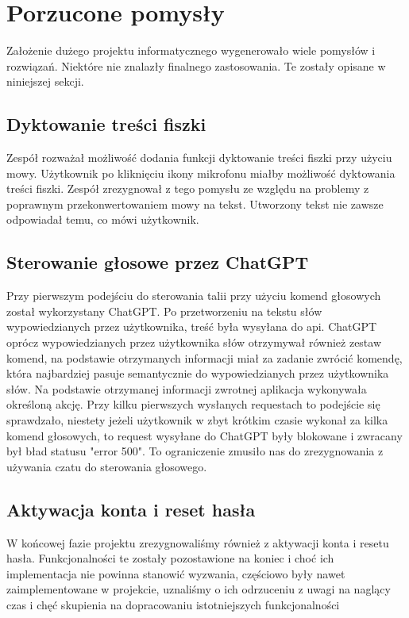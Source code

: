 \section{Porzucone pomysły}
Założenie dużego projektu informatycznego wygenerowało wiele pomysłów i rozwiązań. Niektóre nie znalazły finalnego zastosowania. Te zostały opisane w niniejszej sekcji.

\subsection{Dyktowanie treści fiszki}
Zespół rozważał możliwość dodania funkcji dyktowanie treści fiszki przy użyciu mowy. Użytkownik po kliknięciu ikony mikrofonu miałby możliwość dyktowania treści fiszki. Zespół zrezygnował z tego pomysłu ze względu na problemy z poprawnym przekonwertowaniem mowy na tekst. Utworzony tekst nie zawsze odpowiadał temu, co mówi użytkownik.

\subsection{Sterowanie głosowe przez ChatGPT}
Przy pierwszym podejściu do sterowania talii przy użyciu komend głosowych został wykorzystany ChatGPT. Po przetworzeniu na tekstu słów wypowiedzianych przez użytkownika, treść była wysyłana do api. ChatGPT oprócz wypowiedzianych przez użytkownika słów otrzymywał również zestaw komend, na podstawie otrzymanych informacji miał za zadanie zwrócić komendę, która najbardziej pasuje semantycznie do wypowiedzianych przez użytkownika słów. Na podstawie otrzymanej informacji zwrotnej aplikacja wykonywała określoną akcję. Przy kilku pierwszych wysłanych requestach to podejście się sprawdzało, niestety jeżeli użytkownik w zbyt krótkim czasie wykonał za kilka komend głosowych, to request wysyłane do ChatGPT były blokowane i zwracany był bład statusu "error 500". To ograniczenie zmusiło nas do zrezygnowania z używania czatu do sterowania głosowego.

\subsection{Aktywacja konta i reset hasła}
W końcowej fazie projektu zrezygnowaliśmy również z aktywacji konta i resetu hasła. Funkcjonalności te zostały pozostawione na koniec i choć ich implementacja nie powinna stanowić wyzwania, częściowo były nawet zaimplementowane w projekcie,  uznaliśmy o ich odrzuceniu z uwagi na naglący czas i chęć skupienia na dopracowaniu istotniejszych funkcjonalności



